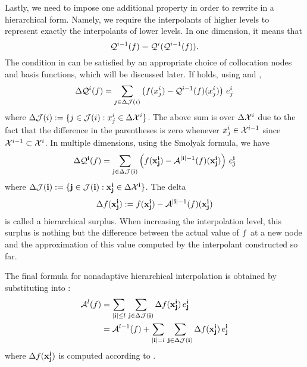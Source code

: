 Lastly, we need to impose one additional property in order to rewrite
 in a hierarchical form. Namely, we require the
interpolants of higher levels to represent exactly the interpolants of lower
levels. In one dimension, it means that
\begin{equation} \elab{tensor-exactness}
  \tensor{i - 1}(\f) = \tensor{i}(\tensor{i - 1}(\f)).
\end{equation}
The condition in  can be satisfied by an appropriate
choice of collocation nodes and basis functions, which will be discussed later.
If  holds, using  and
,
\[
  \Delta\mathcal{Q}^{i}(f) = \sum_{j \in \Delta\mathcal{J}(i)} \left( f(x^i_j) - \mathcal{Q}^{i - 1}(f)(x^i_j) \right) \, e^i_j
\]
where $\Delta\mathcal{J}(i) := \{ j \in \mathcal{J}(i): x^i_j \in \Delta\mathcal{X}^i \}$. The
above sum is over $\Delta\mathcal{X}^i$ due to the fact that the difference in the
parentheses is zero whenever $x^i_j \in \mathcal{X}^{i - 1}$ since $\mathcal{X}^{i - 1} \subset
\mathcal{X}^i$. In multiple dimensions, using the Smolyak formula, we have
\begin{equation} \elab{tensor-delta}
  \Delta\tensor{\vi}(\f) = \sum_{\vj \in \Delta\index(\vi)} \left( \f(\vx^\vi_\vj) - \smolyak{|\vi| - 1}(\f)(\vx^\vi_\vj) \right) \, \e^\vi_\vj
\end{equation}
where $\Delta\mathcal{J}(\mathbf{i}) := \{ \mathbf{j} \in \mathcal{J}(\mathbf{i}): \mathbf{x}^{\mathbf{i}}_{\mathbf{j}} \in \Delta\mathcal{X}^{\mathbf{i}}
\}$. The delta
\begin{equation} \elab{surplus}
  \surplus(\vx^\vi_\vj) := \f(\vx^\vi_\vj) - \smolyak{|\vi| - 1}(\f)(\vx^\vi_\vj)
\end{equation}
is called a hierarchical surplus. When increasing the interpolation level, this
surplus is nothing but the difference between the actual value of $f$ at a new
node and the approximation of this value computed by the interpolant constructed
so far.

The final formula for nonadaptive hierarchical interpolation is obtained by
substituting  into :
\begin{align} 
  \smolyak{l}(\f) &= \sum_{|\vi| \leq l} \, \sum_{\vj \in \Delta\index(\vi)} \surplus(\vx^\vi_\vj) \, \e^\vi_\vj \elab{smolyak-hierarchical} \\
                  &= \smolyak{l-1}(\f) + \sum_{|\vi| = l} \, \sum_{\vj \in \Delta\index(\vi)} \surplus(\vx^\vi_\vj) \, \e^\vi_\vj \nonumber
\end{align}
where $\Delta f(\mathbf{x}^{\mathbf{i}}_{\mathbf{j}})$ is computed according to .
